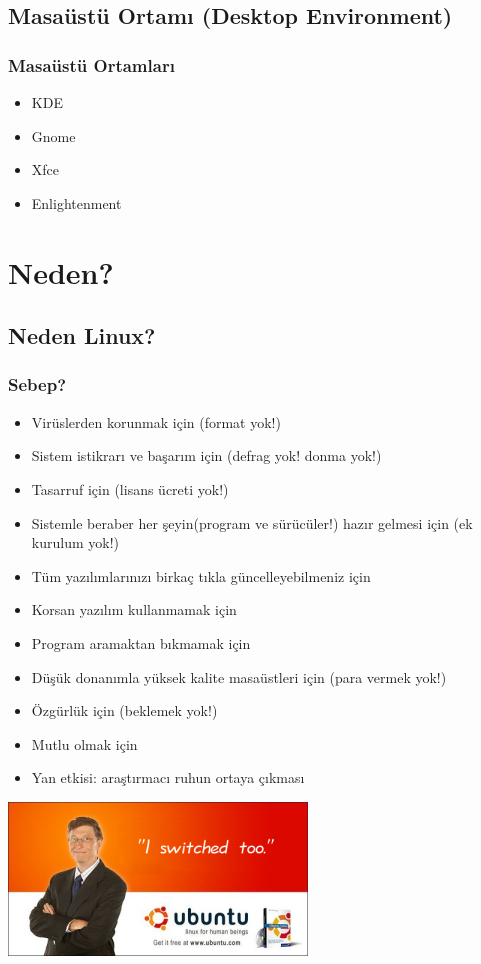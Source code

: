 \documentclass{beamer}
\begin{document}
	\subsection{Masaüstü Ortamı (Desktop Environment)}
		\begin{frame}
		 	\frametitle{Masaüstü Ortamları}
				\begin{itemize}
				 \item KDE
				 \item Gnome
				 \item Xfce
				 \item Enlightenment
				\end{itemize}

		\end{frame}


\section{Neden?}
	\subsection{Neden Linux?}
		\begin{frame}
		 	\frametitle{Sebep?}
			\begin{itemize}[<+->]
			 \item Virüslerden korunmak için (format yok!)
			 \item Sistem istikrarı ve başarım için (defrag yok! donma yok!)
			 \item Tasarruf için (lisans ücreti yok!)
			 \item Sistemle beraber her şeyin(program ve sürücüler!) hazır gelmesi için (ek kurulum yok!)
			 \item Tüm yazılımlarınızı birkaç tıkla güncelleyebilmeniz için
			 \item Korsan yazılım kullanmamak için
			 \item Program aramaktan bıkmamak için
			 \item Düşük donanımla yüksek kalite masaüstleri için (para vermek yok!)
			 \item Özgürlük için (beklemek yok!)
			 \item Mutlu olmak için
			 \item Yan etkisi: araştırmacı ruhun ortaya çıkması
			\end{itemize}

		\end{frame}
		\begin{frame}
		 \begin{center}
			 \includegraphics{img/bgl.png}
		\end{center}
		
		\end{frame}
\end{document}

